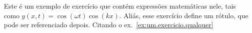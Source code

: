\documentclass[a4paper]{article}
\begin{document}
\maketitle
 
\exercicio \lipsum[1-3]
\exercicio \label{ex:um.exercicio.qualquer}
  Este é um exemplo de exercício que contém expressões matemáticas nele, tais como $y(x,t) = \cos(\omega t)\cos(k x)$.
  Aliás, esse exercício define um rótulo, que pode ser referenciado depois.
\exercicio Citando o ex.~\ref{ex:um.exercicio.qualquer}
\exercicio \lipsum[4-5]

\begin{respostas}
  \exercicio \lipsum[1]
  \exercicio \lipsum[2]
\end{respostas}

\begin{resolucoes}
  \exercicio \lipsum[5]
  \exercicio \lipsum[6]
\end{resolucoes}
\end{document}
